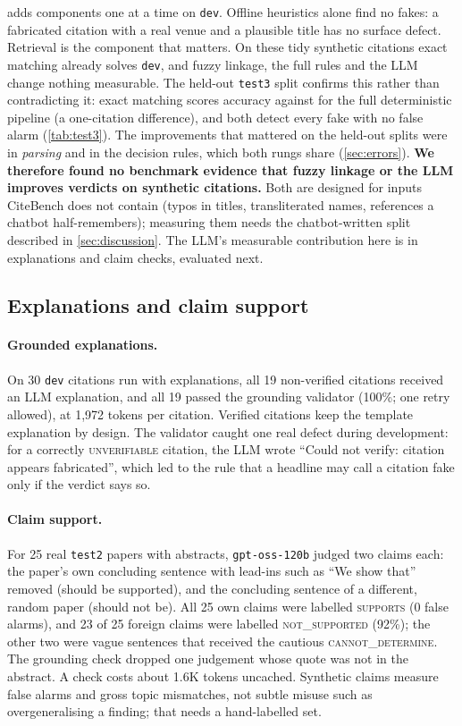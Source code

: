 \documentclass[10pt,twocolumn,a4paper]{article}
\newcommand{\verdict}[1]{\textsc{\MakeLowercase{#1}}}
\begin{document}
 adds components one at a time on \texttt{dev}. Offline heuristics alone find no
fakes: a fabricated citation with a real venue and a plausible title has no surface defect.
Retrieval is the component that matters. On these tidy synthetic citations exact matching already
solves \texttt{dev}, and fuzzy linkage, the full rules and the LLM change nothing measurable. The
held-out \texttt{test3} split confirms this rather than contradicting it: exact matching scores
\ExactAcc{} accuracy against \NoLlmAcc{} for the full deterministic pipeline (a one-citation
difference), and both detect every fake with no false alarm (\cref{tab:test3}). The improvements
that mattered on the held-out splits were in \emph{parsing} and in the decision rules, which both
rungs share (\cref{sec:errors}). \textbf{We therefore found no benchmark evidence that fuzzy linkage
or the LLM improves verdicts on synthetic citations.} Both are designed for inputs CiteBench does not
contain (typos in titles, transliterated names, references a chatbot half-remembers); measuring them
needs the chatbot-written split described in \cref{sec:discussion}. The LLM's measurable contribution
here is in explanations and claim checks, evaluated next.

\subsection{Explanations and claim support}
\paragraph{Grounded explanations.}
On 30 \texttt{dev} citations run with explanations, all 19 non-verified citations received an LLM
explanation, and all 19 passed the grounding validator (100\%; one retry allowed), at 1,972 tokens
per citation. Verified citations keep the template explanation by design. The validator caught one
real defect during development: for a correctly \verdict{UNVERIFIABLE} citation, the LLM wrote
``Could not verify: citation appears fabricated'', which led to the rule that a headline may call a
citation fake only if the verdict says so.

\paragraph{Claim support.}
For 25 real \texttt{test2} papers with abstracts, \texttt{gpt-oss-120b} judged two claims each: the
paper's own concluding sentence with lead-ins such as ``We show that'' removed (should be supported),
and the concluding sentence of a different, random paper (should not be). All 25 own claims were
labelled \textsc{supports} (0 false alarms), and 23 of 25 foreign claims were labelled
\textsc{not\_supported} (92\%); the other two were vague sentences that received the cautious
\textsc{cannot\_determine}. The grounding check dropped one judgement whose quote was not in the
abstract. A check costs about 1.6K tokens uncached. Synthetic claims measure false alarms and gross
topic mismatches, not subtle misuse such as overgeneralising a finding; that needs a hand-labelled
set.
\end{document}
